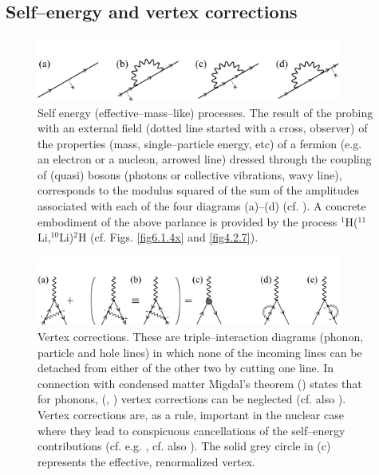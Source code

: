 \begin{subappendices}
\section{Self--energy and vertex corrections}\label{C6AppD}
 \begin{figure}
\centerline{\includegraphics*[width=10cm,angle=0]{C6/figs_C6/fig6_C1}}
\caption{Self energy (effective--mass--like) processes. The result of the probing with an external field (dotted line started with a cross, observer) of the properties (mass, single--particle energy, etc) of a fermion (e.g. an electron or a nucleon, arrowed line) dressed through the coupling of (quasi) bosons (photons or collective vibrations, wavy line), corresponds to the modulus squared of the sum of the amplitudes associated with each of the four diagrams (a)--(d) (cf. \citep{Feynman:75}). A concrete embodiment of the above parlance is provided by the process $^1$H($^{11}$Li,$^{10}$Li)$^2$H (cf. Figs. \ref{fig6.1.4x} and \ref{fig4.2.7}).}\label{fig6_D1}
\end{figure}
 \begin{figure}
\centerline{\includegraphics*[width=10cm,angle=0]{C6/figs_C6/fig6_C2}}
\caption{Vertex corrections. These are triple--interaction  diagrams (phonon, particle and hole lines) in which none of the incoming lines can be detached from either of the other two by cutting one line. In connection with condensed matter Migdal's theorem  (\cite{Migdal:58}) states that for phonons, (\cite{Bardeen:55},  \cite{Frohlich:52}) vertex corrections can be neglected (cf. also \cite{Anderson:64}). Vertex corrections are, as a rule, important in the nuclear case where they lead to conspicuous cancellations of the self--energy contributions (cf. e.g. \cite{Bortignon:83}, cf. also \cite{Anderson:64}). The solid grey circle in (c) represents the effective, renormalized vertex. }\label{fig6_D2}
\end{figure}

\end{subappendices}
